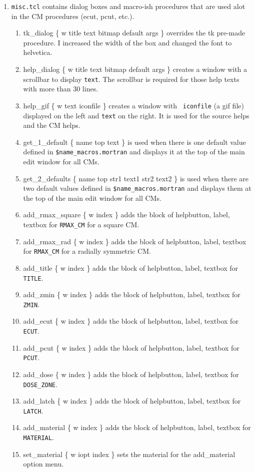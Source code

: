 \documentclass[12pt]{book}
\begin{document}
\begin{enumerate}
\item {\tt misc.tcl} contains dialog boxes and macro-ish procedures that are
used alot in the CM procedures (ecut, pcut, etc.).
\begin{enumerate}
\item {\sf tk\_dialog \{ w title text bitmap default args \}} overrides the tk
pre-made procedure.  I increased the width of the box and changed the
font to helvetica.
\item {\sf help\_dialog \{ w title text bitmap default args \}} creates a
window with a scrollbar to display {\tt text}.  The scrollbar is required
for those help texts with more than 30 lines.
\item {\sf help\_gif \{ w text iconfile \}} creates a window with {\tt
iconfile} (a gif file) displayed on the left and {\tt text} on the right.
It is used for the source helps and the CM helps.
\item {\sf get\_1\_default \{ name top text \}} is used when
there is one default value defined in {\tt \$name\_macros.mortran} and
displays it at the top of the main edit window for all CMs.
\item {\sf get\_2\_defaults \{ name top str1 text1 str2 text2 \}} is used when
there are two default values defined in {\tt \$name\_macros.mortran} and
displays them at the top of the main edit window for all CMs.
\item {\sf add\_rmax\_square \{ w index \}} adds the block of helpbutton, label,
textbox for {\tt RMAX\_CM} for a square CM.
\item {\sf add\_rmax\_rad \{ w index \}} adds the block of helpbutton, label,
textbox for {\tt RMAX\_CM} for a radially symmetric CM.
\item {\sf add\_title \{ w index \}} adds the block of helpbutton, label,
textbox for {\tt TITLE}.
\item {\sf add\_zmin \{ w index \}} adds the block of helpbutton, label,
textbox for {\tt ZMIN}.
\item {\sf add\_ecut \{ w index \}} adds the block of helpbutton, label,
textbox for {\tt ECUT}.
\item {\sf add\_pcut \{ w index \}} adds the block of helpbutton, label,
textbox for {\tt PCUT}.
\item {\sf add\_dose \{ w index \}} adds the block of helpbutton, label,
textbox for {\tt DOSE\_ZONE}.
\item {\sf add\_latch \{ w index \}} adds the block of helpbutton, label,
textbox for {\tt LATCH}.
\item {\sf add\_material \{ w index \}} adds the block of helpbutton, label,
textbox for {\tt MATERIAL}.
\item {\sf set\_material \{ w iopt index \} } sets the material for the
{\sf add\_material} option menu.
\end{enumerate}


\end{enumerate}
\end{document}
